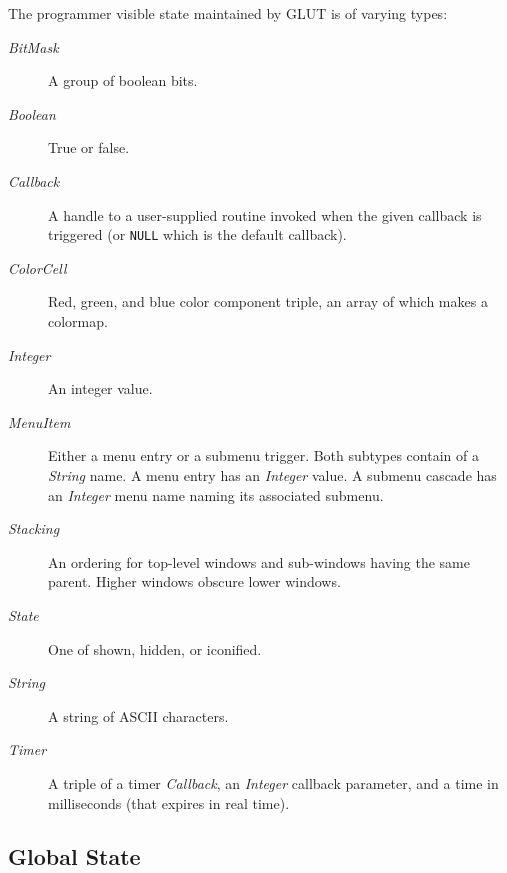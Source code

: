 The programmer visible state maintained by GLUT is of varying types:
\begin{description}

\item[\em BitMask]
A group of boolean bits.

\item[\em Boolean]
True or false.

\item[\em Callback]
A handle to a user-supplied routine invoked when the given callback is triggered
(or {\tt NULL} which is the default callback).

\item[\em ColorCell]
Red, green, and blue color component triple, an array of which makes
a colormap.

\item[\em Integer]
An integer value.

\item[\em MenuItem]
Either a menu entry or a submenu trigger.  Both subtypes contain
of a {\em String} name.  A menu entry has an {\em Integer} value.  A
submenu cascade has an {\em Integer} menu name naming its associated submenu.

\item[\em Stacking]
An ordering for top-level windows and sub-windows having the same
parent.  Higher windows obscure lower windows.

\item[\em State]
One of shown, hidden, or iconified.

\item[\em String]
A string of ASCII characters.

\item[\em Timer]
A triple of a timer {\em Callback}, an {\em Integer} callback parameter, and a time
in milliseconds (that expires in real time).

\end{description}


\subsection{Global State}

